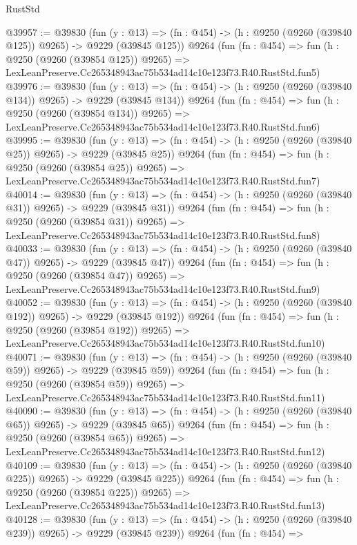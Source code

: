 \begin{lexlean}{RustStd}
\begin{coremodule}
@39957 := @39830
    (fun (y : @13) => (fn : @454) -> (h : @9250 (@9260 (@39840 @125)) @9265) -> @9229 (@39845 @125))
    @9264
    (fun (fn : @454) =>
    fun (h : @9250 (@9260 (@39854 @125)) @9265) =>
    LexLeanPreserve.Cc265348943ac75b534ad14c10e123f73.R40.RustStd.fun5)
@39976 := @39830
    (fun (y : @13) => (fn : @454) -> (h : @9250 (@9260 (@39840 @134)) @9265) -> @9229 (@39845 @134))
    @9264
    (fun (fn : @454) =>
    fun (h : @9250 (@9260 (@39854 @134)) @9265) =>
    LexLeanPreserve.Cc265348943ac75b534ad14c10e123f73.R40.RustStd.fun6)
@39995 := @39830
    (fun (y : @13) => (fn : @454) -> (h : @9250 (@9260 (@39840 @25)) @9265) -> @9229 (@39845 @25))
    @9264
    (fun (fn : @454) =>
    fun (h : @9250 (@9260 (@39854 @25)) @9265) =>
    LexLeanPreserve.Cc265348943ac75b534ad14c10e123f73.R40.RustStd.fun7)
@40014 := @39830
    (fun (y : @13) => (fn : @454) -> (h : @9250 (@9260 (@39840 @31)) @9265) -> @9229 (@39845 @31))
    @9264
    (fun (fn : @454) =>
    fun (h : @9250 (@9260 (@39854 @31)) @9265) =>
    LexLeanPreserve.Cc265348943ac75b534ad14c10e123f73.R40.RustStd.fun8)
@40033 := @39830
    (fun (y : @13) => (fn : @454) -> (h : @9250 (@9260 (@39840 @47)) @9265) -> @9229 (@39845 @47))
    @9264
    (fun (fn : @454) =>
    fun (h : @9250 (@9260 (@39854 @47)) @9265) =>
    LexLeanPreserve.Cc265348943ac75b534ad14c10e123f73.R40.RustStd.fun9)
@40052 := @39830
    (fun (y : @13) => (fn : @454) -> (h : @9250 (@9260 (@39840 @192)) @9265) -> @9229 (@39845 @192))
    @9264
    (fun (fn : @454) =>
    fun (h : @9250 (@9260 (@39854 @192)) @9265) =>
    LexLeanPreserve.Cc265348943ac75b534ad14c10e123f73.R40.RustStd.fun10)
@40071 := @39830
    (fun (y : @13) => (fn : @454) -> (h : @9250 (@9260 (@39840 @59)) @9265) -> @9229 (@39845 @59))
    @9264
    (fun (fn : @454) =>
    fun (h : @9250 (@9260 (@39854 @59)) @9265) =>
    LexLeanPreserve.Cc265348943ac75b534ad14c10e123f73.R40.RustStd.fun11)
@40090 := @39830
    (fun (y : @13) => (fn : @454) -> (h : @9250 (@9260 (@39840 @65)) @9265) -> @9229 (@39845 @65))
    @9264
    (fun (fn : @454) =>
    fun (h : @9250 (@9260 (@39854 @65)) @9265) =>
    LexLeanPreserve.Cc265348943ac75b534ad14c10e123f73.R40.RustStd.fun12)
@40109 := @39830
    (fun (y : @13) => (fn : @454) -> (h : @9250 (@9260 (@39840 @225)) @9265) -> @9229 (@39845 @225))
    @9264
    (fun (fn : @454) =>
    fun (h : @9250 (@9260 (@39854 @225)) @9265) =>
    LexLeanPreserve.Cc265348943ac75b534ad14c10e123f73.R40.RustStd.fun13)
@40128 := @39830
    (fun (y : @13) => (fn : @454) -> (h : @9250 (@9260 (@39840 @239)) @9265) -> @9229 (@39845 @239))
    @9264
    (fun (fn : @454) =>

\end{coremodule}
\end{lexlean}
